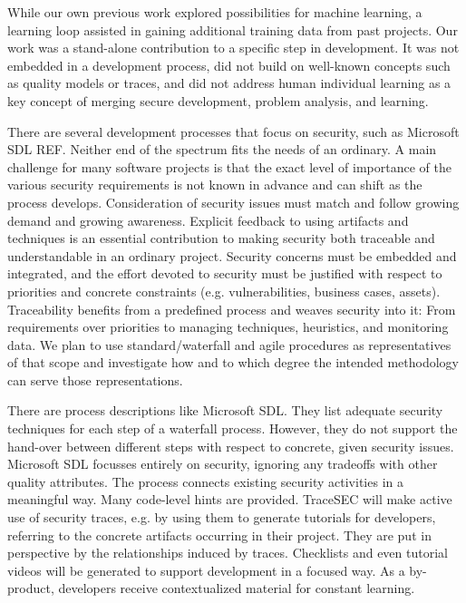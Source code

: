While our own previous work explored possibilities for machine learning, a learning loop assisted in gaining additional training data from past projects. Our work was a stand-alone contribution to a specific step in development. It was not embedded in a development process, did not build on well-known concepts such as quality models or traces, and did not address human individual learning as a key concept of merging secure development, problem analysis, and learning. 

There are several development processes that focus on security, such as Microsoft SDL REF. Neither end of the spectrum fits the needs of an ordinary. A main challenge for many software projects is that the exact level of importance of the various security requirements is not known in advance and can shift as the process develops. Consideration of security issues must match and follow growing demand and growing awareness. Explicit feedback to using artifacts and techniques is an essential contribution to making security both traceable and understandable in an ordinary project. Security concerns must be embedded and integrated, and the effort devoted to security must be justified with respect to priorities and concrete constraints (e.g. vulnerabilities, business cases, assets). Traceability benefits from a predefined process and weaves security into it: From requirements over priorities to managing techniques, heuristics, and monitoring data.  We plan to use standard/waterfall and agile procedures as representatives of that scope and investigate how and to which degree the intended methodology can serve those representations.

There are process descriptions like Microsoft SDL. They list adequate security techniques for each step of a waterfall process. However, they do not support the hand-over between different steps with respect to concrete, given security issues. Microsoft SDL focusses entirely on security, ignoring any tradeoffs with other quality attributes. The process connects existing security activities in a meaningful way. Many code-level hints are provided. TraceSEC will make active use of security traces, e.g. by using them to generate tutorials for developers, referring to the concrete artifacts occurring in their project. They are put in perspective by the relationships induced by traces. Checklists and even tutorial videos will be generated to support development in a focused way. As a by-product, developers receive contextualized material for constant learning.


